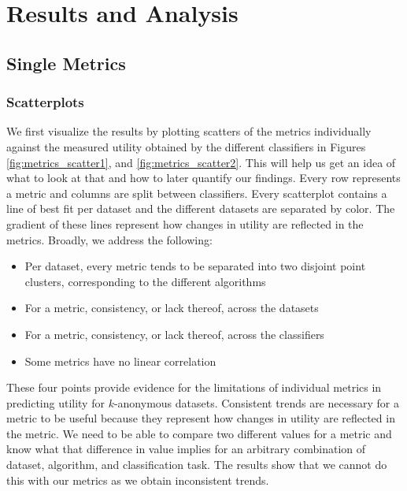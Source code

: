 \chapter{Results and Analysis}
\label{chap:results}
\section{Single Metrics}
\subsection{Scatterplots}
\label{sec:single_metrics}
We first visualize the results by plotting scatters of the metrics individually against the measured utility obtained by the different classifiers in Figures \ref{fig:metrics_scatter1}, and \ref{fig:metrics_scatter2}. This will help us get an idea of what to look at that and how to later quantify our findings. Every row represents a metric and columns are split between classifiers. Every scatterplot contains a line of best fit per dataset and the different datasets are separated by color. The gradient of these lines represent how changes in utility are reflected in the metrics. Broadly, we address the following: 
\begin{itemize}
    \item Per dataset, every metric tends to be separated into two disjoint point clusters, corresponding to the different algorithms
    \item For a metric, consistency, or lack thereof, across the datasets
    \item For a metric, consistency, or lack thereof, across the classifiers
    \item Some metrics have no linear correlation
\end{itemize}

These four points provide evidence for the limitations of individual metrics in predicting utility for $k$-anonymous datasets. Consistent trends are necessary for a metric to be useful because they represent how changes in utility are reflected in the metric. We need to be able to compare two different values for a metric and know what that difference in value implies for an arbitrary combination of dataset, algorithm, and classification task. The results show that we cannot do this with our metrics as we obtain inconsistent trends.


